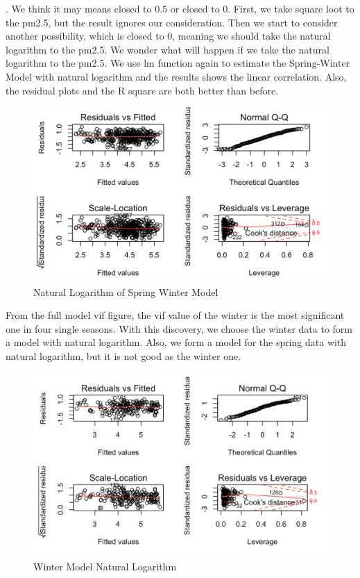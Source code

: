 . We think it may means closed to $0.5$ or closed to $0$. First, we take square loot to the pm2.5, but the result ignores our consideration. Then we start to consider another possibility, which is closed to $0$, meaning we should take the natural logarithm to the pm2.5. We wonder what will happen if we take the natural logarithm to the pm2.5. We use lm function again to estimate the Spring-Winter Model with natural logarithm and the results shows the linear correlation. Also, the residual plots and the R square are both better than before.

\begin{figure}[H]
  \centering
  \includegraphics[width = 1.0\textwidth]{Figures/spring_winter_nl.png}
  \caption[Figures/spring\_winter\_nl.png]{Natural Logarithm of Spring Winter Model}
  \label{fig:Natural Logarithm of Spring Winter Model}
\end{figure}

From the full model vif figure, the vif value of the winter is the most significant one in four single seasons. With this discovery, we choose the winter data to form a model with natural logarithm. Also, we form a model for the spring data with natural logarithm, but it is not good as the winter one.

\begin{figure}[H]
  \centering
  \includegraphics[width = 1.0\textwidth]{Figures/winter_nl.png}
  \caption[Figures/winter\_nl.png]{ Winter Model Natural Logarithm}
  \label{fig: Winter Model Natural Logarithm}
\end{figure}

